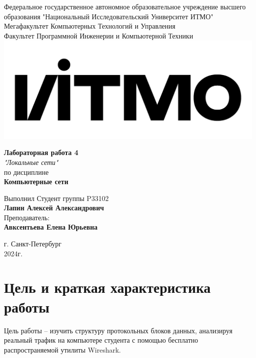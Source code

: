 \documentclass[12pt,onecolumn]{article}
\begin{document}
\setcounter{tocdepth}{4}
\begin{center}
    Федеральное государственное автономное образовательное учреждение высшего образования "Национальный Исследовательский Университет ИТМО"\\ 
    Мегафакультет Компьютерных Технологий и Управления\\
    Факультет Программной Инженерии и Компьютерной Техники \\
    \includegraphics[scale=0.3]{image/itmo.jpg} %
\end{center}
\vspace{1cm}


\begin{center}
    \textbf{Лабораторная работа 4}\\
    \textit{"Локальные сети"}\\
    по дисциплине\\
    \textbf{Компьютерные сети}
\end{center}

\vspace{2cm}

\begin{flushright}
  Выполнил Студент  группы P33102\\
  \textbf{Лапин Алексей Александрович}\\
  Преподаватель: \\
  \textbf{Авксентьева Елена Юрьевна}\\
\end{flushright}

\vspace{6cm}
\begin{center}
    г. Санкт-Петербург\\
    2024г.
\end{center}

\newpage
\tableofcontents
\newpage

\section*{Цель и краткая характеристика работы}
Цель работы – изучить структуру протокольных блоков данных, анализируя реальный трафик на компьютере студента с помощью бесплатно распространяемой утилиты Wireshark.
\end{document}
